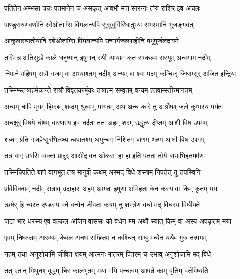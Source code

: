 \twolineshloka
{पतितेन अम्भसा चन्नः पतमानेन च असकृत्}
{आबभौ मत्त सारन्गः तोय राशिर् इव अचलः} %

\twolineshloka
{पाण्डुरारुणवर्णानि स्रोओताम्सि विमलान्यपि}
{सुस्रुवुर्गिरिधातुभ्यः सभस्मानि भुजङ्गवत्} %

\twolineshloka
{आकुलारुणतोयानि स्रोओताम्सि विमलान्यपि}
{उन्मार्गजलवाहीनि बभूवुर्जलदागमे} %

\twolineshloka
{तस्मिन्न् अतिसुखे काले धनुष्मान् इषुमान् रथी}
{व्यायाम कृत सम्कल्पः सरयूम् अन्वगाम् नदीम्} %

\twolineshloka
{निपाने महिषम् रात्रौ गजम् वा अभ्यागतम् नदीम्}
{अन्यम् वा श्वा पदम् कम्चिज् जिघाम्सुर् अजित इन्द्रियः} %

\twolineshloka
{तस्मिम्स्तत्राहमेकान्ते रात्रौ विवृतकार्मुकः}
{तत्राहम् सम्वृतम् वन्यम् हतवाम्स्तीरमागतम्} %

\twolineshloka
{अन्यम् चापि मृगम् हिम्स्रम् शब्दम् श्रुत्वाभु पागतम्}
{अथ अन्ध कारे तु अश्रौषम् जले कुम्भस्य पर्यतः} %

\twolineshloka
{अचक्षुर् विषये घोषम् वारणस्य इव नर्दतः}
{ततः अहम् शरम् उद्धृत्य दीप्तम् आशी विष उपमम्} %

\twolineshloka
{शब्दम् प्रति गजप्रेप्सुरभिलक्ष्य त्वपातयम्}
{अमुन्चम् निशितम् बाणम् अहम् आशी विष उपमम्} %

\twolineshloka
{तत्र वाग् उषसि व्यक्ता प्रादुर् आसीद् वन ओकसः}
{हा हा इति पततः तोये बाणाभिहतमर्मणः} %

\twolineshloka
{तस्मिन्निपतिते बाणे वागभूत् तत्र मानुषी}
{कथम् अस्मद् विधे शस्त्रम् निपतेत् तु तपस्विनि} %

\twolineshloka
{प्रविविक्ताम् नदीम् रात्राव् उदाहारः अहम् आगतः}
{इषुणा अभिहतः केन कस्य वा किम् कृतम् मया} %

\twolineshloka
{ऋषेर् हि न्यस्त दण्डस्य वने वन्येन जीवतः}
{कथम् नु शस्त्रेण वधो मद् विधस्य विधीयते} %

\twolineshloka
{जटा भार धरस्य एव वल्कल अजिन वाससः}
{को वधेन मम अर्थी स्यात् किम् वा अस्य अपकृतम् मया} %

\twolineshloka
{एवम् निष्फलम् आरब्धम् केवल अनर्थ सम्हितम्}
{न कश्चित् साधु मन्येत यथैव गुरु तल्पगम्} %

\twolineshloka
{नहम् तथा अनुशोचामि जीवित क्षयम् आत्मनः}
{मातरम् पितरम् च उभाव् अनुशोचामि मद् विधे} %

\twolineshloka
{तत् एतान् मिथुनम् वृद्धम् चिर कालभृतम् मया}
{मयि पन्चत्वम् आपन्ने काम् वृत्तिम् वर्तयिष्यति} %

